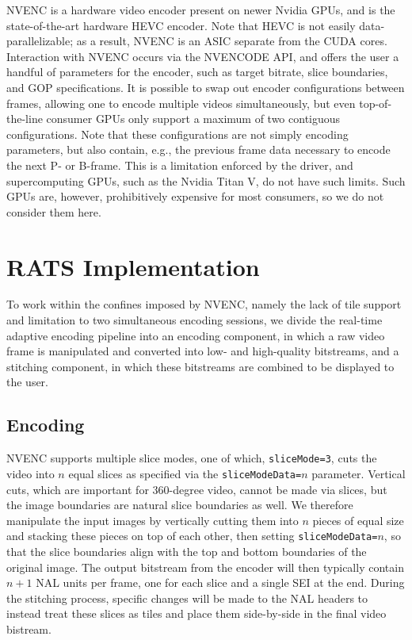 NVENC is a hardware video encoder present on newer Nvidia GPUs, and is the state-of-the-art hardware HEVC encoder. Note that HEVC is not easily data-parallelizable; as a result, NVENC is an ASIC separate from the CUDA cores. Interaction with NVENC occurs via the NVENCODE API, and offers the user a handful of parameters for the encoder, such as target bitrate, slice boundaries, and GOP specifications. It is possible to swap out encoder configurations between frames, allowing one to encode multiple videos simultaneously, but even top-of-the-line consumer GPUs only support a maximum of two contiguous configurations. Note that these configurations are not simply encoding parameters, but also contain, e.g., the previous frame data necessary to encode the next P- or B-frame. This is a limitation enforced by the driver, and supercomputing GPUs, such as the Nvidia Titan V, do not have such limits. Such GPUs are, however, prohibitively expensive for most consumers, so we do not consider them here.

\section{RATS Implementation}
To work within the confines imposed by NVENC, namely the lack of tile support and limitation to two simultaneous encoding sessions, we divide the real-time adaptive encoding pipeline into an encoding component, in which a raw video frame is manipulated and converted into low- and high-quality bitstreams, and a stitching component, in which these bitstreams are combined to be displayed to the user.

\subsection{Encoding}
NVENC supports multiple slice modes, one of which, \texttt{sliceMode=3}, cuts the video into $n$ equal slices as specified via the \texttt{sliceModeData=}$n$ parameter. Vertical cuts, which are important for 360-degree video, cannot be made via slices, but the image boundaries are natural slice boundaries as well. We therefore manipulate the input images by vertically cutting them into $n$ pieces of equal size and stacking these pieces on top of each other, then setting \texttt{sliceModeData=}$n$, so that the slice boundaries align with the top and bottom boundaries of the original image. The output bitstream from the encoder will then typically contain $n+1$ NAL units per frame, one for each slice and a single SEI at the end. During the stitching process, specific changes will be made to the NAL headers to instead treat these slices as tiles and place them side-by-side in the final video bistream.

